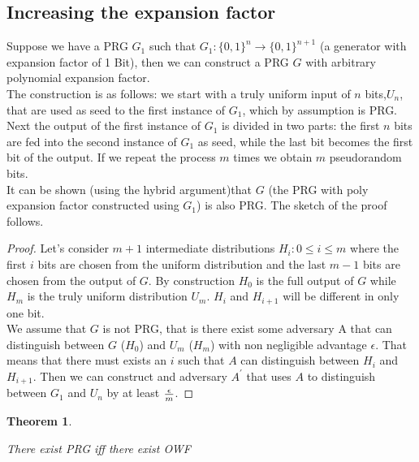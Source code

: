 \documentclass{article}
\newtheorem{thm}{Theorem}[section]
\newenvironment{theorem}{\begin{thm}\begin{rm}}%
{\end{rm}\end{thm}}
\begin{document}
\subsection{Increasing the expansion factor}
Suppose we have a PRG $G_1$ such that $G_1: \{0,1\}^n \rightarrow \{0,1\}^{n+1}$ (a generator with expansion factor of 1 Bit), then we can construct a PRG $G$ with arbitrary polynomial expansion factor.\\
The construction is as follows: we start with a truly uniform input of $n$ bits,$U_n$, that are used as seed to the first instance of $G_1$, which by assumption is PRG. Next the output of the first instance of $G_1$ is divided in two parts: the first $n$ bits are fed into the second instance of $G_1$ as seed, while the last bit becomes the first bit of the output. If we repeat the process $m$ times we obtain $m$ pseudorandom bits.\\
It can be shown (using the hybrid argument)that $G$ (the PRG with poly expansion factor constructed using $G_1$) is also PRG. The sketch of the proof follows.
\begin{proof}
Let's consider $m+1$ intermediate distributions $H_i: 0 \leq i \leq m$ where the first $i$ bits are chosen from the uniform distribution and the last $m-1$ bits are chosen from the output of $G$. By construction $H_0$ is the full output of $G$ while $H_m$ is the truly uniform distribution $U_m$. $H_i$ and $H_{i+1}$ will be different in only one bit.\\
We assume that $G$ is not PRG, that is there exist some adversary A that can distinguish between $G$ ($H_0$) and $U_m$ ($H_m$) with non negligible advantage $\epsilon$. That means that there must exists an $i$ such that $A$ can distinguish between $H_i$ and $H_{i+1}$. Then we can construct and adversary $A^{'}$ that uses $A$ to distinguish between $G_1$ and $U_n$ by at least $\epsilon \over m$.
\end{proof}

\begin{theorem}
There exist PRG iff there exist OWF
\end{theorem}
\end{document}
